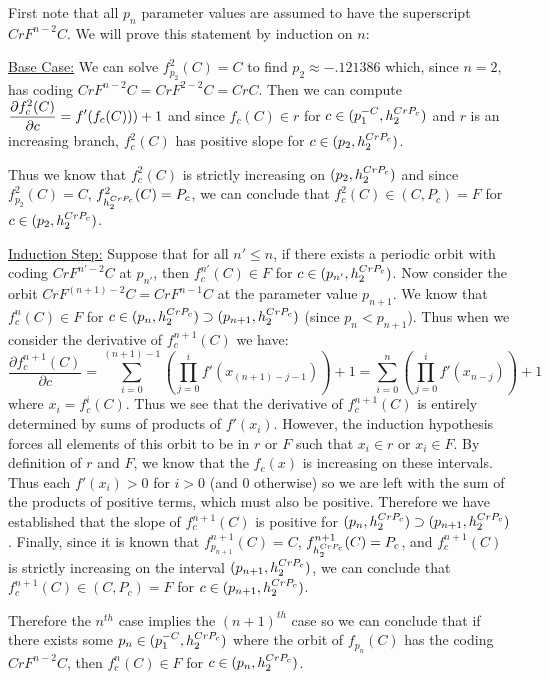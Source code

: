 		\begin{myproof}
			First note that all $p_n$ parameter values are assumed to have the superscript $CrF^{n-2}C$. We will prove this statement by induction on $n$:

			\underline{Base Case:} We can solve $f^2_{p_2} (C)=C$ to find $p_2 \approx -.121386$ which, since $n = 2$, has coding $CrF^{n-2}C = CrF^{2-2}C = CrC$. Then we can compute $\displaystyle\frac{\partial f^2_c (C)}{\partial c} = f' (f_c (C)))+1$ and since $f_c (C) \in r$ for $c \in (p^{-C}_1, h^{CrP_c}_2)$ and $r$ is an increasing branch, $f_{c}^2 (C)$ has positive slope for $c \in (p_2,h^{CrP_c}_2)$.

			Thus we know that $f^2_c (C)$ is strictly increasing on $ (p_2, h^{CrP_c}_2)$ and since $f^2_{p_2} (C) = C$, $f^2_{h^{CrP_c}_2} (C) = P_c$, we can conclude that $f^2_c (C) \in (C, P_c) = F$ for $c \in (p_2, h^{CrP_c}_2)$.

			\underline{Induction Step:} Suppose that for all $n' \leq n$, if there exists a periodic orbit with coding $CrF^{n'-2}C$ at $p_{n'}$, then $f^{n'}_{c} (C) \in F$ for $c \in (p_{n'}, h^{CrP_c}_2)$. Now consider the orbit $CrF^{ (n+1)-2}C = CrF^{n-1}C$ at the parameter value $p_{n+1}$. We know that $f^n_c (C) \in F$ for $c \in (p_n, h^{CrP_c}_2) \supset (p_{n+1}, h^{CrP_c}_2)$ (since $p_n < p_{n+1}$). Thus when we consider the derivative of $f^{n+1}_{c} (C)$ we have:
			\[
				\frac{\partial f^{n+1}_c (C)}{\partial c} = \sum^{ (n + 1) - 1}_{i=0}\left (\prod^i_{j=0} f' (x_{ (n+1)-j-1})\right) + 1 =  \sum^{n}_{i=0}\left (\prod^i_{j=0} f' (x_{n-j})\right) + 1
			\]
			where $x_i = f^i_c (C)$. Thus we see that the derivative of $f^{n+1}_c (C)$ is entirely determined by sums of products of $f' (x_i)$. However, the induction hypothesis forces all elements of this orbit to be in $r$ or $F$ such that $x_i \in r$ or $x_i \in F$. By definition of $r$ and $F$, we know that the $f_c (x)$ is increasing on these intervals. Thus each $f' (x_i)>0$ for $i > 0$ (and 0 otherwise) so we are left with the sum of the products of positive terms, which must also be positive. Therefore we have established that the slope of $f^{n+1}_c (C)$ is positive for $ (p_n, h^{CrP_c}_2) \supset (p_{n+1}, h^{CrP_c}_2)$. Finally, since it is known that $f^{n+1}_{p_{n+1}} (C) = C$, $f^{n+1}_{h^{CrP_c}_2} (C) = P_c$, and $f^{n+1}_c (C)$ is strictly increasing on the interval $ (p_{n+1}, h^{CrP_c}_2)$, we can conclude that $f^{n+1}_c (C) \in (C, P_c) = F$ for $c \in (p_{n+1}, h^{CrP_c}_2)$.

			Therefore the $n^{th}$ case implies the $ (n+1)^{th}$ case so we can conclude that if there exists some $p_n \in (p^{-C}_1, h^{CrP_c}_2)$ where the orbit of $f_{p_n} (C)$ has the coding $CrF^{n-2}C$, then $f^n_c (C) \in F$ for $c\in (p_n , h^{CrP_c}_2)$.
		\end{myproof}

